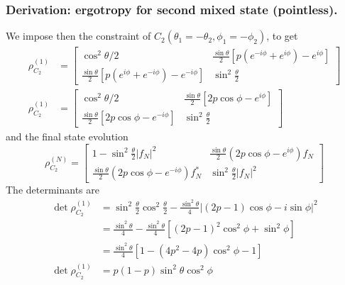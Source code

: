 \documentclass[../../../main.tex]{subfiles}
\begin{document}
\subsubsection{Derivation: ergotropy for second mixed state (pointless).}
We impose then the constraint of $C_2(\theta_1=-\theta_2,\phi_1=-\phi_2)$, to get
\begin{align*}
  \rho^{(1)}_{C_2}  & =
  \begin{bmatrix}
    \cos ^2 \theta/2                                                               & \frac{\sin \theta  }{2} \left[p(e^{-i\phi}+e^{i\phi}) -e^{i\phi}  \right] \\
    \frac{\sin \theta  }{2} \left[p(e^{i\phi} + e^{-i\phi} ) - e^{-i\phi}  \right] & \sin ^2 \frac{\theta  }{2}
  \end{bmatrix} \\
  \rho ^{(1)}_{C_2} & =
  \begin{bmatrix}
    \cos ^2 \theta/2                                                & \frac{\sin \theta  }{2} \left[2p \cos \phi - e^{i\phi}  \right] \\
    \frac{\sin \theta  }{2} \left[2p \cos\phi - e^{-i\phi}  \right] & \sin ^2 \frac{\theta  }{2}
  \end{bmatrix}
\end{align*}
and the final state evolution
\begin{equation*}
  \rho ^{(N)}_{C_2} = \begin{bmatrix}
    1 - \sin^2 \frac{\theta }{2} |f_N|^2                                 & \frac{\sin \theta }{2} \left( 2p \cos \phi-e^{i\phi} \right)f_N \\
    \frac{\sin \theta }{2} \left( 2p \cos \phi-e^{-i\phi} \right) f_N ^* & \sin^2 \frac{\theta }{2 } |f_N|^2
  \end{bmatrix}
\end{equation*}
The determinants are
\begin{align*}
  \det\rho^{(1)}_{C_2}
                         & =
  \sin^2\frac{\theta}{2}\cos^2\frac{\theta}{2}
  -
  \frac{\sin^2\theta}{4}
  \left|(2p-1) \cos \phi- i \sin \phi\right|^2 \\
                         & =
  \frac{\sin^2\theta}{4}
  -\frac{\sin^2\theta}{4}
  \left[
    (2p-1)^2\cos^2\phi
    +\sin^2 \phi
  \right]                                      \\
                         & =
  \frac{\sin^2\theta}{4}
  \left[
    1-
    (4p^2-4p)\cos^2\phi-1
  \right]                                      \\
  \det \rho ^{(1)}_{C_2} & =
  p(1-p)\sin ^2\theta \cos^2 \phi
\end{align*}
\end{document}
